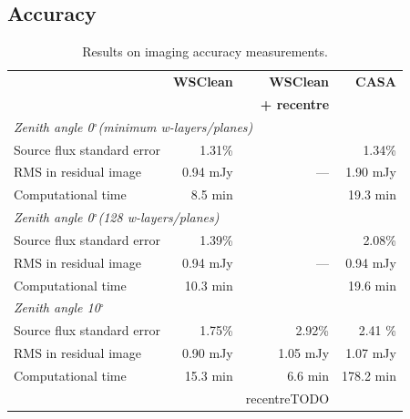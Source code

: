 \documentclass[useAMS,usenatbib]{mn2e}
\newcommand{\degree}{\ensuremath{^{\circ}}\xspace}
\begin{document}
\subsection{Accuracy}
\begin{table}%
\caption{Results on imaging accuracy measurements.} \label{tbl:accuracy-measurements}%
\begin{center}\begin{tabular}{lrrr}%
\hline\hline
& \textbf{WSClean} & \textbf{WSClean}    & \textbf{CASA} \\
&                  & \textbf{+ recentre} & \\
\hline
\multicolumn{3}{l}{\textit{Zenith angle 0\degree (minimum w-layers/planes)}} \\
\hline
Source flux standard error & 1.31\% & & 1.34\% \\
RMS in residual image & 0.94 mJy & --- & 1.90 mJy\\
Computational time & 8.5 min & & 19.3 min\\
\hline
\multicolumn{3}{l}{\textit{Zenith angle 0\degree (128 w-layers/planes)}} \\
\hline
Source flux standard error & 1.39\% & & 2.08\% \\
RMS in residual image & 0.94 mJy & --- & 0.94 mJy \\
Computational time & 10.3 min & & 19.6 min \\
\hline
\multicolumn{3}{l}{\textit{Zenith angle 10\degree}} \\
\hline
Source flux standard error & 1.75\% & 2.92\% & 2.41 \%\\
RMS in residual image & 0.90 mJy & 1.05 mJy & 1.07 mJy \\
Computational time & 15.3 min & 6.6 min & 178.2 min \\
& & recentreTODO & \\
\hline\hline
\end{tabular}\end{center}\end{table}
\end{document}
